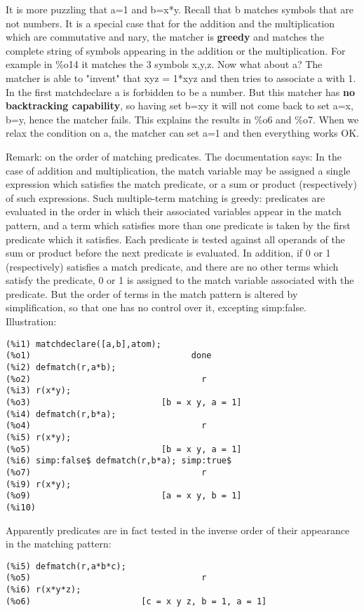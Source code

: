 \documentclass[a4paper,11pt]{article}
\begin{document}
It is more puzzling that a=1 and b=x*y. Recall that b matches symbols
that are not numbers. It is a special case that for the addition and
the multiplication which are commutative and nary, the matcher is
\textbf{greedy} and matches the complete string of symbols appearing in the
addition or the multiplication. For example in \%o14 it matches the 3
symbols x,y,z.  Now what about a? The matcher is able to "invent" that
xyz = 1*xyz and then tries to associate a with 1. In the first
matchdeclare a is forbidden to be a number. But this matcher has \textbf{no
backtracking capability}, so having set b=xy it will not come back to
set a=x, b=y, hence the matcher fails. This explains the results in
\%o6 and \%o7. When we relax the condition on a, the matcher can set a=1
and then everything works OK.

Remark: on the order of matching predicates. The documentation says:
In the case of addition and multiplication, the match variable may be
assigned a single expression which satisfies the match predicate, or a
sum or product (respectively) of such expressions. Such multiple-term
matching is greedy: predicates are evaluated in the order in which
their associated variables appear in the match pattern, and a term
which satisfies more than one predicate is taken by the first
predicate which it satisfies. Each predicate is tested against all
operands of the sum or product before the next predicate is
evaluated. In addition, if 0 or 1 (respectively) satisfies a match
predicate, and there are no other terms which satisfy the predicate, 0
or 1 is assigned to the match variable associated with the predicate.
But the order of terms in the match pattern is altered by simplification,
so that one has no control over it, excepting simp:false. Illustration:
\begin{verbatim}
(%i1) matchdeclare([a,b],atom);
(%o1)                                done
(%i2) defmatch(r,a*b);
(%o2)                                  r
(%i3) r(x*y);
(%o3)                          [b = x y, a = 1]
(%i4) defmatch(r,b*a);
(%o4)                                  r
(%i5) r(x*y);
(%o5)                          [b = x y, a = 1]
(%i6) simp:false$ defmatch(r,b*a); simp:true$
(%o7)                                  r
(%i9) r(x*y);
(%o9)                          [a = x y, b = 1]
(%i10) 
\end{verbatim}
Apparently predicates are in fact tested in the inverse order of their appearance 
in the matching pattern:
\begin{verbatim}
(%i5) defmatch(r,a*b*c);
(%o5)                                  r
(%i6) r(x*y*z);
(%o6)                      [c = x y z, b = 1, a = 1]
\end{verbatim}
\end{document}
